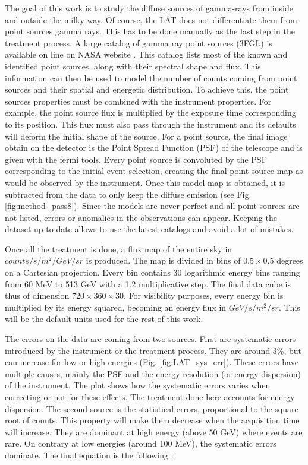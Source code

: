 The goal of this work is to study the diffuse sources of gamma-rays from inside and outside the milky way. Of course, the LAT does not differentiate them from point sources gamma rays. This has to be done manually as the last step in the treatment process. A large catalog of gamma ray point sources (3FGL) is available on line on NASA website . This catalog lists most of the known and identified point sources, along with their spectral shape and flux. This information can then be used to model the number of counts coming from point sources and their spatial and energetic distribution. To achieve this, the point sources properties must be combined with the instrument  properties. For example, the point source flux is multiplied by the exposure time corresponding to its position. This flux must also pass through the instrument and its defaults will deform the initial shape of the source. For a point source, the final image obtain on the detector is the Point Spread Function (PSF) of the telescope and is given with the fermi tools. Every point source is convoluted by the PSF corresponding to the initial event selection, creating the final point source map as would be observed by the instrument.
Once this model map is obtained, it is subtracted from the data to only keep the diffuse emission (see Fig. \ref{fig:method_pass8}). Since the models are never perfect and all point sources are not listed, errors or anomalies in the observations can appear. Keeping the dataset up-to-date allows to use the latest catalogs and avoid a lot of mistakes.


Once all the treatment is done, a flux map of the entire sky in $counts/s/m^2/GeV/sr$ is produced. The map is divided in bins of $0.5 \times 0.5$ degrees on a Cartesian projection. Every bin contains 30 logarithmic energy bins ranging from 60 MeV to 513 GeV with a 1.2 multiplicative step. The final data cube is thus of dimension $720 \times 360 \times 30$. For visibility purposes, every energy bin is multiplied by its energy squared, becoming an energy flux in $GeV/s/m^2/sr$. This will be the default units used for the rest of this work.

The errors on the data are coming from two sources. First are systematic errors introduced by the instrument or the treatment process. They are around 3\%, but can increase for low or high energies (Fig. \ref{fig:LAT_sys_err}). These errors have multiple causes, mainly the PSF and the energy resolution (or energy dispersion) of the instrument. The plot shows how the systematic errors varies when correcting or not for these effects. The treatment done here accounts for energy dispersion.
The second source is the statistical errors, proportional to the square root of counts. This property will make them decrease when the acquisition time will increase. They are dominant at high energy (above 50 GeV) where events are rare. On contrary at low energies (around 100 MeV), the systematic errors dominate. The final equation is the following :

